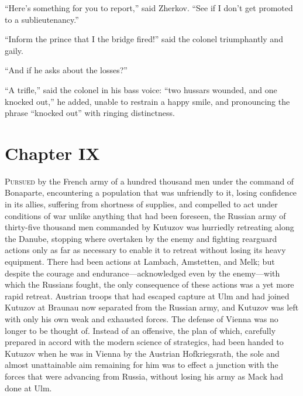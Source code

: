 ``Here's something for you to report,'' said Zherkov. ``See if I
don't get promoted to a sublieutenancy.''

``Inform the prince that I the bridge fired!'' said the colonel
triumphantly and gaily.

``And if he asks about the losses?''

``A trifle,'' said the colonel in his bass voice: ``two hussars
wounded, and one knocked out,'' he added, unable to restrain a
happy smile, and pronouncing the phrase ``knocked out'' with
ringing distinctness.


\chapter*{Chapter IX}
\ifaudio     {} \fi

\lettrine[lines=2, loversize=0.3, lraise=0]{\initfamily P}{ursued}
by the French army of a hundred thousand men under the
command of Bonaparte, encountering a population that was
unfriendly to it, losing confidence in its allies, suffering from
shortness of supplies, and compelled to act under conditions of
war unlike anything that had been foreseen, the Russian army of
thirty-five thousand men commanded by Kutuzov was hurriedly
retreating along the Danube, stopping where overtaken by the
enemy and fighting rearguard actions only as far as necessary to
enable it to retreat without losing its heavy equipment.  There
had been actions at Lambach, Amstetten, and Melk; but despite the
courage and endurance---acknowledged even by the enemy---with
which the Russians fought, the only consequence of these actions
was a yet more rapid retreat. Austrian troops that had escaped
capture at Ulm and had joined Kutuzov at Braunau now separated
from the Russian army, and Kutuzov was left with only his own
weak and exhausted forces. The defense of Vienna was no longer to
be thought of. Instead of an offensive, the plan of which,
carefully prepared in accord with the modern science of
strategics, had been handed to Kutuzov when he was in Vienna by
the Austrian Hofkriegsrath, the sole and almost unattainable aim
remaining for him was to effect a junction with the forces that
were advancing from Russia, without losing his army as Mack had
done at Ulm.

